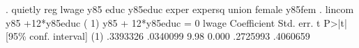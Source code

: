 . quietly reg lwage y85 educ y85educ exper expersq union female y85fem
{\smallskip}
. lincom y85 +12*y85educ
{\smallskip}
 ( 1)  y85 + 12*y85educ = 0
{\smallskip}
       lwage {\VBAR} Coefficient  Std. err.      t    P>|t|     [95\% conf. interval]
         (1) {\VBAR}   .3393326   .0340099     9.98   0.000     .2725993    .4060659
{\smallskip}
